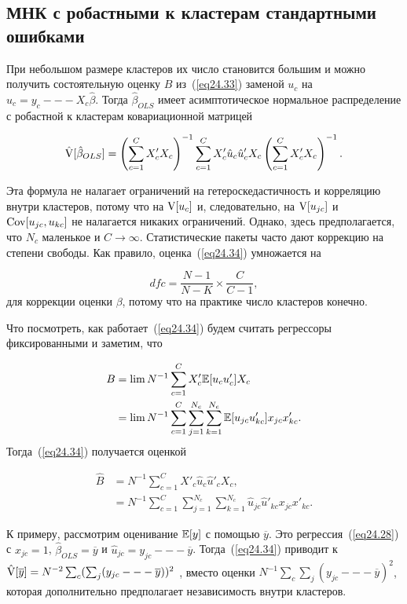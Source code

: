 \subsection*{МНК с робастными к кластерам стандартными ошибками}

При небольшом размере кластеров их число становится большим и можно получить состоятельную оценку $B$ из~(\ref{eq24.33}) заменой $u_c$ на $\hat u_c = y_c --- X_c \hat \beta$. Тогда $\hat \beta_{OLS}$ имеет асимптотическое нормальное распределение с робастной к кластерам ковариационной матрицей

\begin{equation}
\label{eq24.34}
\hat {\mathrm{V}} [\hat \beta_{OLS}] = \left( \sum_{c=1}^C X'_c X_c \right)^{-1} \sum_{c=1}^C X'_c \hat u_c \hat u'_c X_c \left( \sum_{c=1}^C X'_c X_c \right)^{-1}. 
\end{equation}

Эта формула не налагает ограничений на гетероскедастичность и корреляцию внутри кластеров, потому что на $\mathrm{V}[u_c]$ и, следовательно, на $\mathrm{V}[u_{jc}]$ и $\mathrm{Cov}[u_{jc}, u_{kc}]$ не налагается никаких ограничений. Однако, здесь предполагается, что $N_c$ маленькое и $C \to \infty$. Статистические пакеты часто дают коррекцию на степени свободы. Как правило, оценка~(\ref{eq24.34}) умножается на

$$
dfc = \frac{N-1}{N-K} \times \frac{C}{C-1},
$$
для коррекции оценки $\beta$, потому что на практике число кластеров конечно. 

Что посмотреть, как работает~(\ref{eq24.34}) будем считать регрессоры фиксированными и заметим, что

\begin{align}
B & = \lim N^{-1} \sum_{c=1}^C X'_c \mathbb{E}[u_c u'_c] X_c \nonumber\\
& = \lim N^{-1} \sum_{c=1}^C \sum_{j=1}^{N_c} \sum_{k=1}^{N_c} \mathbb{E}[u_{jc}u'_{kc}] x_{jc} x'_{kc}. \nonumber
\end{align}
Тогда~(\ref{eq24.34}) получается оценкой

\begin{align}
\hat{B} & =  N^{-1} \sum_{c=1}^C X'_c \hat u_c \hat u'_c X_c, \nonumber\\
& =  N^{-1} \sum_{c=1}^C \sum_{j=1}^{N_c} \sum_{k=1}^{N_c} \hat u_{jc} \hat u'_{kc} x_{jc} x'_{kc}. \nonumber
\end{align}

К примеру, рассмотрим оценивание $\mathbb{E}[y]$ с помощью $\overline{y}$. Это регрессия~(\ref{eq24.28}) с $x_{jc}=1$, $\hat \beta_{OLS} = \overline{y}$ и $\hat u_{jc} = y_{jc} --- \overline{y}$. Тогда~(\ref{eq24.34}) приводит к $\hat {\mathrm{V}}[\overline{y}] = N^{-2} \sum_c (\sum_j (y_{jc} --- \overline{y}))^2$ , вместо оценки $N^{-1} \sum_c \sum_j (y_{jc} --- \overline{y})^2$, которая дополнительно предполагает независимость внутри кластеров. 

